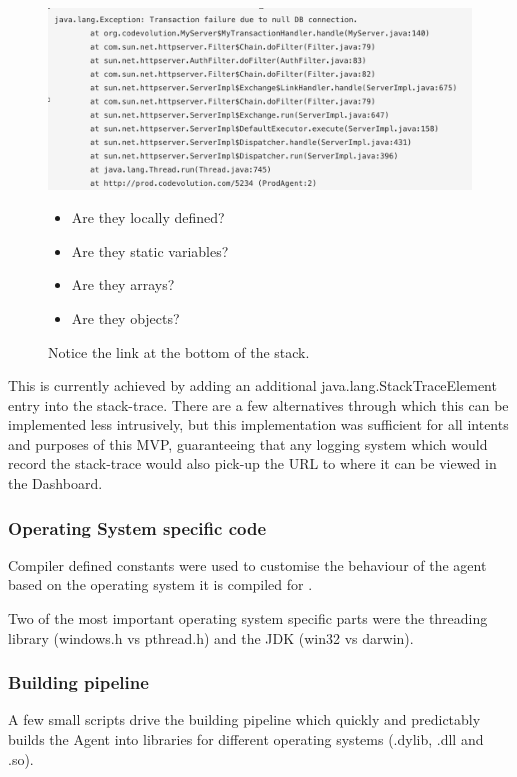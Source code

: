\begin{figure}[H]
  \centering
    \includegraphics[width=\textwidth]{stack-with-link.png} 
    \begin{itemize}
  \item Are they locally defined?
  \item Are they static variables? 
  \item Are they arrays?
  \item Are they objects?
\end{itemize}


  \caption[Stack-trace with portal dashboard link]{Notice the link at the bottom of the stack.}
\end{figure}

This is currently achieved by adding an additional java.lang.StackTraceElement entry into the stack-trace. There are a few alternatives through which this can be implemented less intrusively, but this implementation was sufficient for all intents and purposes of this MVP, guaranteeing that any logging system which would record the stack-trace would also pick-up the URL to where it can be viewed in the Dashboard.

\subsubsection{Operating System specific code}
Compiler defined constants were used to customise the behaviour of the agent based on the operating system it is compiled for \cite{compiler}.

Two of the most important operating system specific parts were the threading library (windows.h vs pthread.h) and the JDK (win32 vs darwin).

\subsubsection{Building pipeline}
A few small scripts drive the building pipeline which quickly and predictably builds the Agent into libraries for different operating systems (.dylib, .dll and .so).

